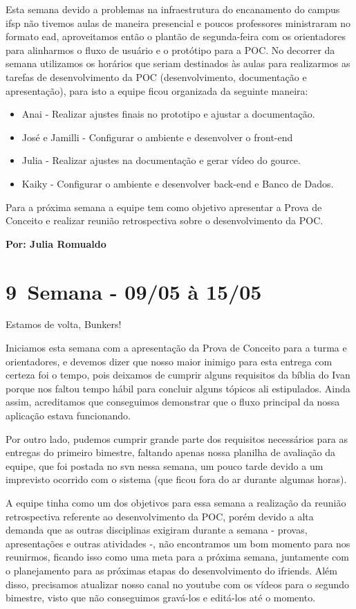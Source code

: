 Esta semana devido a problemas na infraestrutura do encanamento do campus \acs{ifsp} não tivemos aulas de maneira presencial e poucos professores ministraram no formato \acs{ead}, aproveitamos então o plantão de segunda-feira com os orientadores para alinharmos o fluxo de usuário e o protótipo para a \acs{POC}. No decorrer da semana utilizamos os horários que seriam destinados às aulas para realizarmos as tarefas de desenvolvimento da \acs{POC} (desenvolvimento, documentação e apresentação), para isto a equipe ficou organizada da seguinte maneira: 
\begin{itemize}
    \item Anai - Realizar ajustes finais no prototipo e ajustar a documentação.
    \item José e Jamilli - Configurar o ambiente e desenvolver o \gls{front-end}
    \item Julia - Realizar ajustes na documentação e gerar vídeo do \gls{gource}.
    \item Kaiky - Configurar o ambiente e desenvolver \gls{back-end} e Banco de Dados.
\end{itemize}
\noindent Para a próxima semana a equipe tem como objetivo apresentar a Prova de Conceito e realizar reunião retrospectiva sobre o desenvolvimento da \gls{POC}.

\textbf{Por: Julia Romualdo}

\section{9\textordfeminine \, Semana - 09/05 à 15/05}
Estamos de volta, Bunkers!

Iniciamos esta semana com a apresentação da Prova de Conceito para a turma e orientadores, e devemos dizer que nosso maior inimigo para esta entrega com certeza foi o tempo, pois deixamos de cumprir alguns requisitos da bíblia do Ivan porque nos faltou tempo hábil para concluir alguns tópicos ali estipulados. Ainda assim, acreditamos que conseguimos demonstrar que o fluxo principal da nossa aplicação estava funcionando. 

Por outro lado, pudemos cumprir grande parte dos requisitos necessários para as entregas do primeiro bimestre, faltando apenas nossa planilha de avaliação da equipe, que foi postada no \gls{svn} nessa semana, um pouco tarde devido a um imprevisto ocorrido com o sistema (que ficou fora do ar durante algumas horas). 

A equipe tinha como um dos objetivos para essa semana a realização da reunião retrospectiva referente ao desenvolvimento da \gls{POC}, porém devido a alta demanda que as outras disciplinas exigiram durante a semana - provas, apresentações e outras atividades -, não encontramos um bom momento para nos reunirmos, ficando isso como uma meta para a próxima semana, juntamente com o planejamento para as próximas etapas do desenvolvimento do \gls{ifriends}. Além disso, precisamos atualizar nosso canal no \gls{youtube} com os vídeos para o segundo bimestre, visto que não conseguimos gravá-los e editá-los até o momento. 


